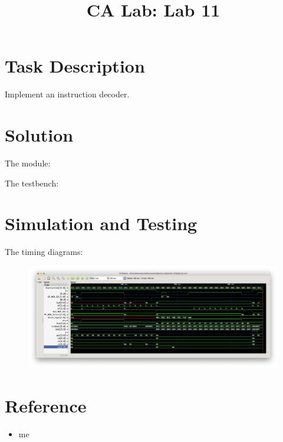 \documentclass{../../../template}
\title{CA Lab: Lab 11}
\begin{document}
    \maketitle

    \section*{Task Description}

    Implement an instruction decoder.

    \section*{Solution}

    The module:

    

    The testbench:

    

    \section*{Simulation and Testing}

    The timing diagrams:

    \begin{figure}[H]
        \includegraphics[width=12cm]{diagram.png}
    \end{figure}

    \section*{Reference}

    \begin{itemize}
        \item me
    \end{itemize}
\end{document}
